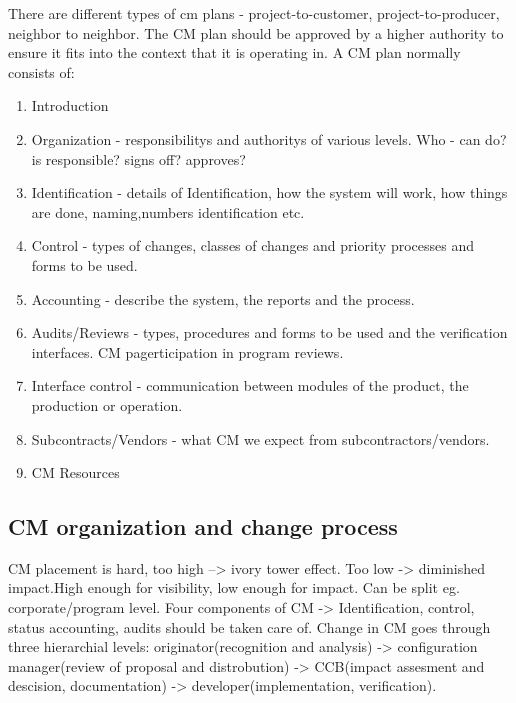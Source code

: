 \documentclass{article}
\begin{document}
\begin{itemize}
\begin{itemize}
\begin{itemize}
    There are different types of cm plans - project-to-customer, project-to-producer, neighbor to neighbor. The CM plan should be approved by a higher authority to ensure it fits into the context that
    it is operating in. 
    A CM plan normally consists of:
    \begin{enumerate}
    \item Introduction
    \item Organization - responsibilitys and authoritys of various levels. Who - can do? is responsible? signs off? approves?
    \item Identification - details of Identification, how the system will work, how things are done, naming,numbers identification etc.
    \item Control - types of changes, classes of changes and priority processes and forms to be used.
    \item Accounting - describe the system, the reports and the process.
    \item Audits/Reviews - types, procedures and forms to be used and the verification interfaces. CM pagerticipation in program reviews.
    \item Interface control - communication between modules of the product, the production or operation.
    \item Subcontracts/Vendors - what CM we expect from subcontractors/vendors.
    \item CM Resources
    \end{enumerate}

    \subsection{CM organization and change process}
    CM placement is hard, too high --> ivory tower effect. Too low -> diminished impact.High enough for visibility, low enough for impact. Can be split eg. corporate/program level.
    Four components of CM -> Identification, control, status accounting, audits should be taken care of.
    Change in CM goes through three hierarchial levels: originator(recognition and analysis) ->  configuration manager(review of proposal and distrobution)
    -> CCB(impact assesment and descision, documentation) -> developer(implementation, verification).

\end{itemize}
\end{itemize}
\end{itemize}
\end{document}
